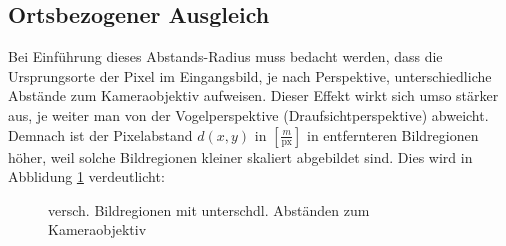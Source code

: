 \subsection{Ortsbezogener Ausgleich}
Bei Einführung dieses Abstands-Radius muss bedacht werden, dass die Ursprungsorte der Pixel im Eingangsbild, je nach Perspektive, unterschiedliche Abstände zum Kameraobjektiv aufweisen. Dieser Effekt wirkt sich umso stärker aus, je weiter man von der Vogelperspektive (Draufsichtperspektive) abweicht. 
\newpage
Demnach ist der Pixelabstand $d(x,y)$ in $[\frac{m}{\text{px}}]$ in entfernteren Bildregionen höher, weil solche Bildregionen kleiner skaliert abgebildet sind. Dies wird in Abblidung \ref{Skalierung} verdeutlicht:
\vskip 10pt
\begin{figure}[h]
  \centering
  \caption{versch. Bildregionen mit unterschdl. Abständen zum Kameraobjektiv}
  \label{Skalierung}
\end{figure}

